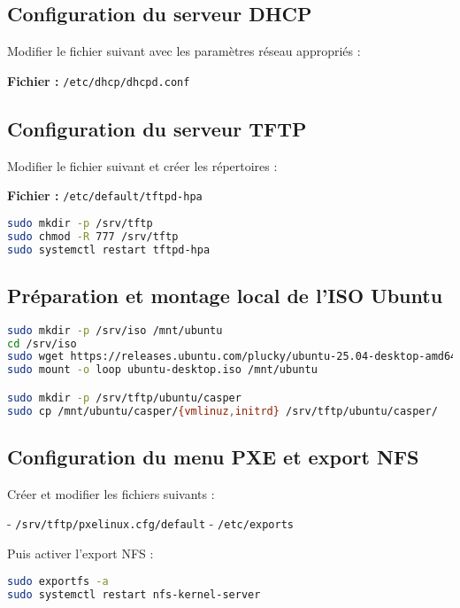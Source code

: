 \documentclass[a4paper,12pt]{article}
\begin{document}
\subsection{Configuration du serveur DHCP}

Modifier le fichier suivant avec les paramètres réseau appropriés :

\textbf{Fichier :} \texttt{/etc/dhcp/dhcpd.conf}

\subsection{Configuration du serveur TFTP}

Modifier le fichier suivant et créer les répertoires :

\textbf{Fichier :} \texttt{/etc/default/tftpd-hpa}

\begin{lstlisting}[language=bash]
sudo mkdir -p /srv/tftp
sudo chmod -R 777 /srv/tftp
sudo systemctl restart tftpd-hpa
\end{lstlisting}

\subsection{Préparation et montage local de l'ISO Ubuntu}

\begin{lstlisting}[language=bash]
sudo mkdir -p /srv/iso /mnt/ubuntu
cd /srv/iso
sudo wget https://releases.ubuntu.com/plucky/ubuntu-25.04-desktop-amd64.iso -O ubuntu-desktop.iso
sudo mount -o loop ubuntu-desktop.iso /mnt/ubuntu

sudo mkdir -p /srv/tftp/ubuntu/casper
sudo cp /mnt/ubuntu/casper/{vmlinuz,initrd} /srv/tftp/ubuntu/casper/
\end{lstlisting}

\subsection{Configuration du menu PXE et export NFS}

Créer et modifier les fichiers suivants :

- \texttt{/srv/tftp/pxelinux.cfg/default}
- \texttt{/etc/exports}

Puis activer l’export NFS :

\begin{lstlisting}[language=bash]
sudo exportfs -a
sudo systemctl restart nfs-kernel-server
\end{lstlisting}
\end{document}
